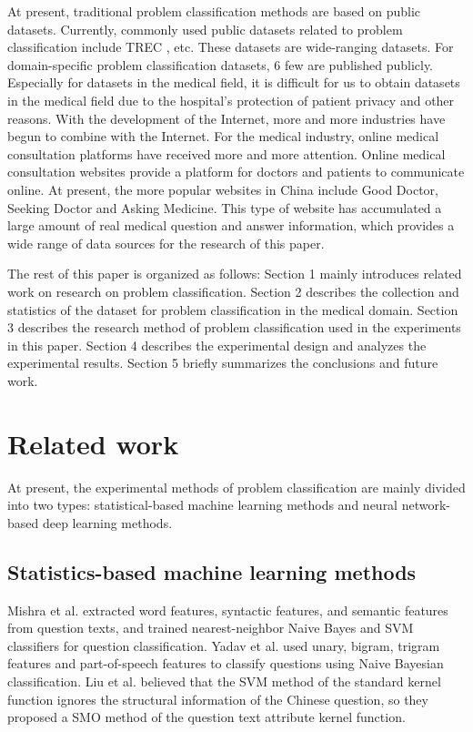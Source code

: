 \documentclass{article}
\begin{document}
At present, traditional problem classification methods are based on public datasets. Currently, commonly used public datasets related to problem classification include TREC \cite{voorhees1999trec}, etc. These datasets are wide-ranging datasets. For domain-specific problem classification datasets,
6
 few are published publicly. Especially for datasets in the medical field, it is difficult for us to obtain datasets in the medical field due to the hospital's protection of patient privacy and other reasons. With the development of the Internet, more and more industries have begun to combine with the Internet. For the medical industry, online medical consultation platforms have received more and more attention. Online medical consultation websites provide a platform for doctors and patients to communicate online. At present, the more popular websites in China include Good Doctor, Seeking Doctor and Asking Medicine. This type of website has accumulated a large amount of real medical question and answer information, which provides a wide range of data sources for the research of this paper.

The rest of this paper is organized as follows: Section 1 mainly introduces related work on research on problem classification. Section 2 describes the collection and statistics of the dataset for problem classification in the medical domain. Section 3 describes the research method of problem classification used in the experiments in this paper. Section 4 describes the experimental design and analyzes the experimental results. Section 5 briefly summarizes the conclusions and future work.

\section{Related work}
At present, the experimental methods of problem classification are mainly divided into two types: statistical-based machine learning methods and neural network-based deep learning methods.

\subsection{Statistics-based machine learning methods}
Mishra \cite{mishra2013question} et al. extracted word features, syntactic features, and semantic features from question texts, and trained nearest-neighbor Naive Bayes and SVM classifiers for question classification. Yadav \cite{yadav2013question} et al. used unary, bigram, trigram features and part-of-speech features to classify questions using Naive Bayesian classification. Liu \cite{liu2014chinese} et al. believed that the SVM method of the standard kernel function ignores the structural information of the Chinese question, so they proposed a SMO method of the question text attribute kernel function.
\end{document}

